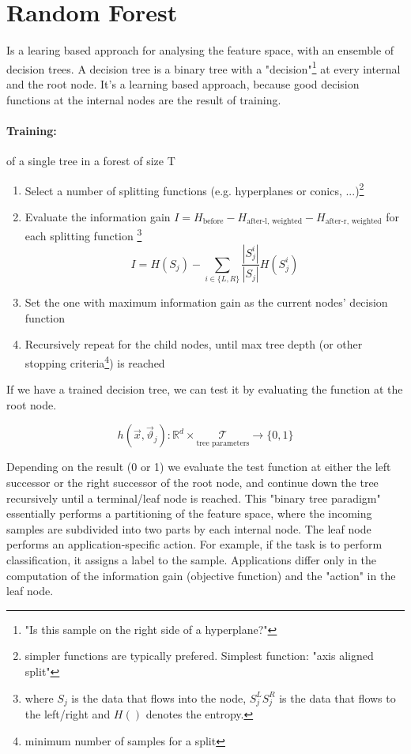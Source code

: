 
\section*{Random Forest}

Is a learing based approach for analysing the feature space, with an ensemble of decision trees. A decision tree is a binary tree with a "decision"\footnote{"Is this sample on the right side of a hyperplane?"} at every internal and the root node. It's a learning based approach, because good decision functions at the internal nodes are the result of training.


\paragraph{Training:} of a single tree in a forest of size T
\begin{enumerate}
  \item Select a number of splitting functions (e.g. hyperplanes or conics, ...)\footnote{simpler functions are typically prefered. Simplest function: "axis aligned split"}
  \item Evaluate the information gain $I = H_{\text{before}} - H_{\text{after-l, weighted}} - H_{\text{after-r, weighted}}$ for each splitting function \footnote{where \(S_j\) is the data that flows into the node, \(S^L_j S^R_j\) is the data that flows to the left/right and \(H()\) denotes the entropy.}
  \[I = H(S_j) - \sum_{i \in \{L,R\}} \frac{|S^i_j|}{|S_j|} H(S^i_j)\]
  \item Set the one with maximum information gain as the current nodes' decision function
  \item Recursively repeat for the child nodes, until max tree depth (or other stopping criteria\footnote{minimum number of samples for a split}) is reached
\end{enumerate}

If we have a trained decision tree, we can test it by evaluating the function at the root node.

\[h(\vec{x}, \vec{\vartheta}_j): \mathbb{R}^d \times \underset{\text{tree parameters}}{\mathcal{T}} \rightarrow \{0, 1\}\]

Depending on the result (0 or 1) we evaluate the test function at either the left successor or the right successor of the root node, and continue down the tree recursively until a terminal/leaf node is reached. This "binary tree paradigm" essentially performs a partitioning of the feature space, where the incoming samples are subdivided into two parts by each internal node.
The leaf node performs an application-specific action. For example, if the task is to perform classification, it assigns a label to the sample. Applications differ only in the computation of the information gain (objective function) and the "action" in the leaf node.

